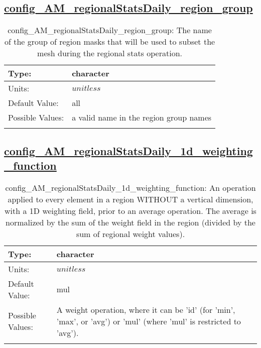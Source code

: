 \subsection[config\_AM\_regionalStatsDaily\_region\_group]{\hyperref[sec:nm_tab_AM_regionalStatsDaily]{config\_AM\_regionalStatsDaily\_region\_group}}
\label{subsec:nm_sec_config_AM_regionalStatsDaily_region_group}
\begin{center}
\begin{longtable}{| p{2.0in} || p{4.0in} |}
    \hline
    Type: & character \\
    \hline
    Units: & $unitless$ \\
    \hline
    Default Value: & all \\
    \hline
    Possible Values: & a valid name in the region group names \\
    \hline
    \caption{config\_AM\_regionalStatsDaily\_region\_group: The name of the group of region masks that will be used to subset the mesh during the regional stats operation.}
\end{longtable}
\end{center}
\subsection[config\_AM\_regionalStatsDaily\_1d\_weighting\_function]{\hyperref[sec:nm_tab_AM_regionalStatsDaily]{config\_AM\_regionalStatsDaily\_1d\_weighting\_function}}
\label{subsec:nm_sec_config_AM_regionalStatsDaily_1d_weighting_function}
\begin{center}
\begin{longtable}{| p{2.0in} || p{4.0in} |}
    \hline
    Type: & character \\
    \hline
    Units: & $unitless$ \\
    \hline
    Default Value: & mul \\
    \hline
    Possible Values: & A weight operation, where it can be 'id' (for 'min', 'max', or 'avg') or 'mul' (where 'mul' is restricted to 'avg'). \\
    \hline
    \caption{config\_AM\_regionalStatsDaily\_1d\_weighting\_function: An operation applied to every element in a region WITHOUT a vertical dimension, with a 1D weighting field, prior to an average operation. The average is normalized by the sum of the weight field in the region (divided by the sum of regional weight values).}
\end{longtable}
\end{center}
